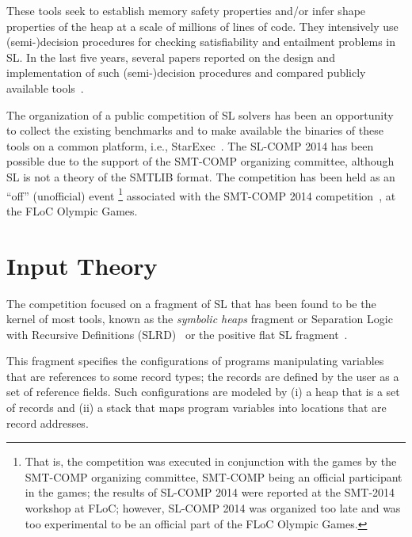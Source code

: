 \documentclass[twoside,11pt]{article}
\begin{document}
These tools seek to establish memory safety properties and/or infer shape properties of the heap at a scale of millions of lines of code.
They intensively use (semi-)decision procedures for checking satisfiability and entailment problems in SL.
In the last five years, several papers reported on the design and implementation of such (semi-)decision procedures and compared publicly available tools~\cite{HasseIOP13}.

The organization of a public competition of SL solvers has been an opportunity 
to collect the existing benchmarks and  
to make available the binaries of these tools on a common platform, i.e., StarExec~\cite{StarExecsite}.
The SL-COMP 2014 has been possible due to the support of the SMT-COMP organizing committee, 
although SL is not a theory of the SMTLIB format.
The competition has been held as an ``off'' (unofficial) event \footnote{That is, the competition was executed in conjunction with the games by the SMT-COMP organizing committee, SMT-COMP being an official participant in the games; the results of SL-COMP 2014 were reported at the SMT-2014 workshop at FLoC; however, SL-COMP 2014 was organized too late and was too experimental to be an official part of the FLoC Olympic Games.}
associated with the SMT-COMP 2014 competition~\cite{SMTCOMPsite}, at the FLoC Olympic Games.


\section{Input Theory}

The competition focused on a fragment of SL that has been found to be the kernel of most tools, known 
as
the \emph{symbolic heaps} fragment
or Separation Logic with Recursive Definitions (SLRD)~\cite{IosifRS13} or
the positive flat SL fragment~\cite{AntonopoulosGHKO14}. 

This fragment specifies the configurations of programs manipulating variables that are references to some record types; the records are defined by the user as a set of reference fields.
Such configurations are modeled by
(i) a heap that is a set of records and
(ii) a stack that maps program variables into locations that are record addresses.
\end{document}
